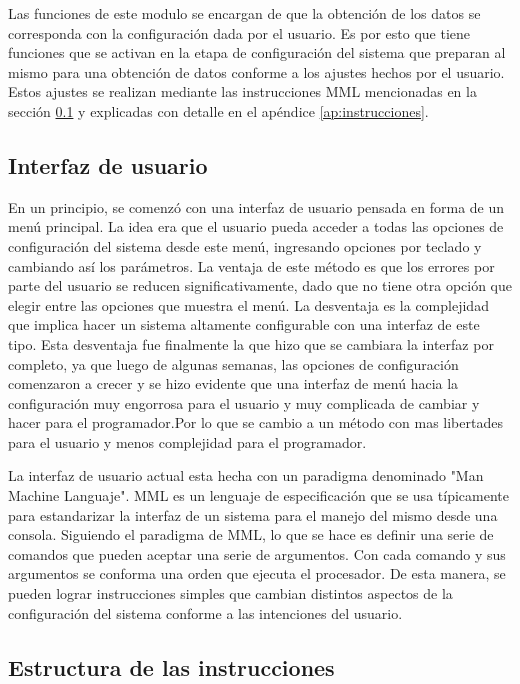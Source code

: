 Las funciones de este modulo se encargan de que la obtención de los datos se corresponda con la configuración dada por el usuario. Es por esto que tiene funciones que se activan en la etapa de configuración del sistema que preparan al mismo para una obtención de datos conforme a los ajustes hechos por el usuario. Estos ajustes se realizan mediante las instrucciones MML mencionadas en la sección \ref{sub:interfaz_de_usuario} y explicadas con detalle en el apéndice \ref{ap:instrucciones}.


\subsection{Interfaz de usuario} %
\label{sub:interfaz_de_usuario}


En un principio, se comenzó con una interfaz de usuario pensada en forma de un menú principal. La idea era que el usuario pueda acceder a todas las opciones de configuración del sistema desde este menú, ingresando opciones por teclado y cambiando así los parámetros. La ventaja de este método es que los errores por parte del usuario se reducen significativamente, dado que no tiene otra opción que elegir entre las opciones que muestra el menú. La desventaja es la complejidad que implica hacer un sistema altamente configurable con una interfaz de este tipo. Esta desventaja fue finalmente la que hizo que se cambiara la interfaz por completo, ya que luego de algunas semanas, las opciones de configuración comenzaron a crecer y se hizo evidente que una interfaz de menú hacia la configuración muy engorrosa para el usuario y muy complicada de cambiar y hacer para el programador.Por lo que se cambio a un método con mas libertades para el usuario y menos complejidad para el programador.

La interfaz de usuario actual esta hecha con un paradigma denominado "Man Machine Languaje". MML es un lenguaje de especificación que se usa típicamente para estandarizar la interfaz de un sistema para el manejo del mismo desde una consola. Siguiendo el paradigma de MML, lo que se hace es definir una serie de comandos que pueden aceptar una serie de argumentos. Con cada comando y sus argumentos se conforma una orden que ejecuta el procesador. De esta manera, se pueden lograr instrucciones simples que cambian distintos aspectos de la configuración del sistema conforme a las intenciones del usuario.

\subsection{Estructura de las instrucciones}

